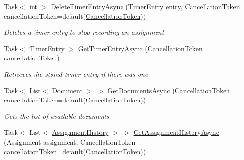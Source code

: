 \begin{DoxyCompactItemize}
Task$<$ int $>$ \hyperlink{class_field_service_1_1_data_1_1_sample_assignment_service_a6850d968047b81d3be77437d140cc896}{Delete\+Timer\+Entry\+Async} (\hyperlink{class_field_service_1_1_data_1_1_timer_entry}{Timer\+Entry} entry, \hyperlink{_view_models_2_assignment_view_model_8cs_aba80ec766846c61f55644fd23860cb18}{Cancellation\+Token} cancellation\+Token=default(\hyperlink{_view_models_2_assignment_view_model_8cs_aba80ec766846c61f55644fd23860cb18}{Cancellation\+Token}))
\begin{DoxyCompactList}\small\item\em Deletes a timer entry to stop recording an assignment \end{DoxyCompactList}\item 
Task$<$ \hyperlink{class_field_service_1_1_data_1_1_timer_entry}{Timer\+Entry} $>$ \hyperlink{class_field_service_1_1_data_1_1_sample_assignment_service_ada066507e249195499a043fe2b12c35a}{Get\+Timer\+Entry\+Async} (\hyperlink{_view_models_2_assignment_view_model_8cs_aba80ec766846c61f55644fd23860cb18}{Cancellation\+Token} cancellation\+Token)
\begin{DoxyCompactList}\small\item\em Retrieves the stored timer entry if there was one \end{DoxyCompactList}\item 
Task$<$ List$<$ \hyperlink{class_field_service_1_1_data_1_1_document}{Document} $>$ $>$ \hyperlink{class_field_service_1_1_data_1_1_sample_assignment_service_aa62795761f40466e30590ceda142f257}{Get\+Documents\+Async} (\hyperlink{_view_models_2_assignment_view_model_8cs_aba80ec766846c61f55644fd23860cb18}{Cancellation\+Token} cancellation\+Token=default(\hyperlink{_view_models_2_assignment_view_model_8cs_aba80ec766846c61f55644fd23860cb18}{Cancellation\+Token}))
\begin{DoxyCompactList}\small\item\em Gets the list of available documents \end{DoxyCompactList}\item 
Task$<$ List$<$ \hyperlink{class_field_service_1_1_data_1_1_assignment_history}{Assignment\+History} $>$ $>$ \hyperlink{class_field_service_1_1_data_1_1_sample_assignment_service_ab64836471b95bd1e0055ff124c4f22a9}{Get\+Assignment\+History\+Async} (\hyperlink{class_field_service_1_1_data_1_1_assignment}{Assignment} assignment, \hyperlink{_view_models_2_assignment_view_model_8cs_aba80ec766846c61f55644fd23860cb18}{Cancellation\+Token} cancellation\+Token=default(\hyperlink{_view_models_2_assignment_view_model_8cs_aba80ec766846c61f55644fd23860cb18}{Cancellation\+Token}))

\end{DoxyCompactItemize}

